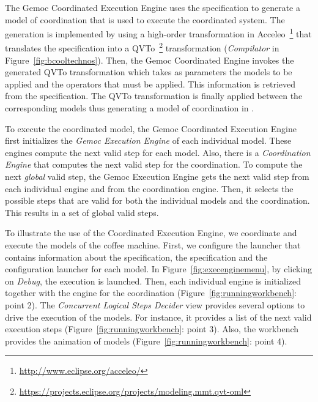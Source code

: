 The Gemoc Coordinated Execution Engine uses the \bflow specification to generate a model of coordination that is used to execute the coordinated system. The generation is implemented by using a high-order transformation in Acceleo~\footnote{\url{http://www.eclipse.org/acceleo/}} that translates the \bcool specification into a QVTo~\footnote{\url{https://projects.eclipse.org/projects/modeling.mmt.qvt-oml}} transformation (\emph{Compilator} in Figure~\ref{fig:bcooltechnos}). Then, the Gemoc Coordinated Engine invokes the generated QVTo transformation which takes as parameters the models to be applied and the operators that must be applied. This information is retrieved from the \bflow specification. The QVTo transformation is finally applied between the corresponding models thus generating a model of coordination in \ccsl. 

To execute the coordinated model, the Gemoc Coordinated Execution Engine first initializes the \emph{Gemoc Execution Engine} of each individual model. These engines compute the next valid step for each model. Also, there is a \emph{Coordination Engine} that computes the next valid step for the coordination. To compute the next \emph{global} valid step, the Gemoc Execution Engine gets the next valid step from each individual engine and from the coordination engine. Then, it selects the possible steps that are valid for both the individual models and the coordination. This results in a set of global valid steps. 

To illustrate the use of the Coordinated Execution Engine, we coordinate and execute the models of the coffee machine. First, we configure the launcher that contains information about the \bcool specification, the \bflow specification and the configuration launcher for each model. In Figure~\ref{fig:execenginemenu}, by clicking on \emph{Debug}, the execution is launched. Then, each individual engine is initialized together with the engine for the coordination (Figure~\ref{fig:runningworkbench}: point 2). The \emph{Concurrent Logical Steps Decider} view provides several options to drive the execution of the models. For instance, it provides a list of the next valid execution steps (Figure~\ref{fig:runningworkbench}: point 3). Also, the workbench provides the animation of models (Figure~\ref{fig:runningworkbench}: point 4). 

